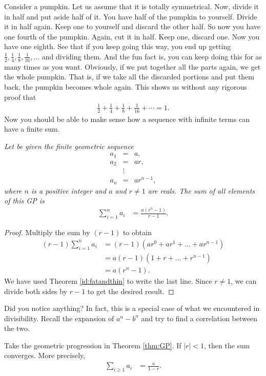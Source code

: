 \documentclass{subfile}
\begin{document}
	Consider a pumpkin. Let us assume that it is totally symmetrical. Now, divide it in half and put aside half of it. You have half of the pumpkin to yourself. Divide it in half again. Keep one to yourself and discard the other half. So now you have one fourth of the pumpkin. Again, cut it in half. Keep one, discard one. Now you have one eighth. See that if you keep going this way, you end up getting $\frac{1}{2},\frac{1}{4},\frac{1}{8},\frac{1}{16},\ldots$ and dividing them. And the fun fact is, you can keep doing this for as many times as you want. Obviously, if we put together all the parts again, we get the whole pumpkin. That is, if we take all the discarded portions and put them back, the pumpkin becomes whole again. This shows us without any rigorous proof that
		\begin{align*}
			\frac{1}{2}+\frac{1}{4}+\frac{1}{8}+\frac{1}{16}+\cdots=1.
		\end{align*}
	Now you should be able to make sense how a sequence with infinite terms can have a finite sum.
		\begin{theorem}\slshape\label{thm:GP}
			Let be given the finite geometric sequence
				\begin{eqnarray*}
					a_1 & = & a,\\
					a_2 & = & ar,\\
					& \vdots &\\
					a_n & = & ar^{n-1},
				\end{eqnarray*}
			where $n$ is a positive integer and $a$ and $r \neq 1$ are reals. The sum of all elements of this GP is
				\begin{align*}
					\sum_{i=1}^{n} a_i &= \frac{a \left(r^n-1\right)}{r-1}.
				\end{align*}
		\end{theorem}
		
		\begin{proof}
			Multiply the sum by $(r-1)$ to obtain
				\begin{align*}
					(r-1)\sum_{i=1}^{n} a_i &= (r-1)(ar^0 + ar^1 + \dots + ar^{n-1})\\
											&= a(r-1)(1+r+ \dots + r^{n-1})\\
											&= a(r^n -1).
				\end{align*}
			We have used Theorem \ref{id:fatandthin} to write the last line. Since $r \neq 1$, we can divide both sides by $r-1$ to get the desired result.
		\end{proof}
	Did you notice anything? In fact, this is a special case of what we encountered in divisibility. Recall the expansion of $a^n-b^n$ and try to find a correlation between the two.
		\begin{corollary}
			Take the geometric progression in Theorem \ref{thm:GP}. If $|r|<1$, then the sum converges. More precisely,
				\begin{align*}
					\sum_{i\geq1} a_i &= \frac{a}{1-r}.
				\end{align*}
		\end{corollary}
		
\end{document}
